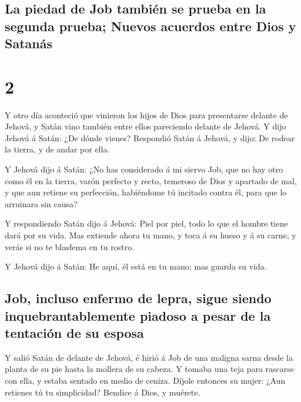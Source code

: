 \hypertarget{la-piedad-de-job-tambiuxe9n-se-prueba-en-la-segunda-prueba-nuevos-acuerdos-entre-dios-y-satanuxe1s}{%
\subsection{La piedad de Job también se prueba en la segunda prueba;
Nuevos acuerdos entre Dios y
Satanás}\label{la-piedad-de-job-tambiuxe9n-se-prueba-en-la-segunda-prueba-nuevos-acuerdos-entre-dios-y-satanuxe1s}}

\hypertarget{section-18-2}{%
\section{2}\label{section-18-2}}

 Y otro día aconteció que vinieron los hijos de Dios para
presentarse delante de Jehová, y Satán vino también entre ellos
pareciendo delante de Jehová.  Y dijo Jehová á Satán: ¿De
dónde vienes? Respondió Satán á Jehová, y dijo: De rodear la tierra, y
de andar por ella.

 Y Jehová dijo á Satán: ¿No has considerado á mi siervo
Job, que no hay otro como él en la tierra, varón perfecto y recto,
temeroso de Dios y apartado de mal, y que aun retiene su perfección,
habiéndome tú incitado contra él, para que lo arruinara sin causa?

 Y respondiendo Satán dijo á Jehová: Piel por piel, todo
lo que el hombre tiene dará por su vida.  Mas extiende
ahora tu mano, y toca á su hueso y á su carne, y verás si no te blasfema
en tu rostro.

 Y Jehová dijo á Satán: He aquí, él está en tu mano; mas
guarda su vida.

\hypertarget{job-incluso-enfermo-de-lepra-sigue-siendo-inquebrantablemente-piadoso-a-pesar-de-la-tentaciuxf3n-de-su-esposa}{%
\subsection{Job, incluso enfermo de lepra, sigue siendo
inquebrantablemente piadoso a pesar de la tentación de su
esposa}\label{job-incluso-enfermo-de-lepra-sigue-siendo-inquebrantablemente-piadoso-a-pesar-de-la-tentaciuxf3n-de-su-esposa}}

 Y salió Satán de delante de Jehová, é hirió á Job de una
maligna sarna desde la planta de su pie hasta la mollera de su cabeza.
 Y tomaba una teja para rascarse con ella, y estaba
sentado en medio de ceniza.  Díjole entonces su mujer:
¿Aun retienes tú tu simplicidad? Bendice á Dios, y muérete.


